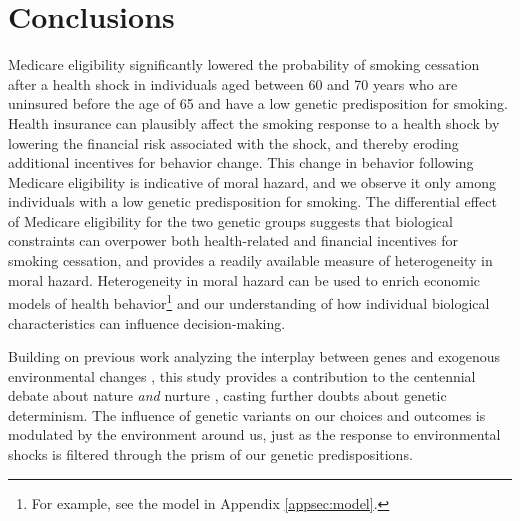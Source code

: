 \documentclass[11pt]{article}
\begin{document}
\section{Conclusions}\label{sec:conclusion}

Medicare eligibility significantly lowered the probability of smoking cessation after a health shock in individuals aged between 60 and 70 years who are uninsured before the age of 65 and have a low genetic predisposition for smoking.
Health insurance can plausibly affect the smoking response to a health shock by lowering the financial risk associated with the shock, and thereby eroding additional incentives for behavior change.
This change in behavior following Medicare eligibility is indicative of moral hazard, and we observe it only among individuals with a low genetic predisposition for smoking.
The differential effect of Medicare eligibility for the two genetic groups suggests that biological constraints can overpower both health-related and financial incentives for smoking cessation, and provides a readily available measure of heterogeneity in moral hazard.
Heterogeneity in moral hazard can be used to enrich economic models of health behavior\footnote{For example, see the model in Appendix \ref{appsec:model}.} and our understanding of how individual biological characteristics can influence decision-making.

Building on previous work analyzing the interplay between genes and exogenous environmental changes \citep{Fletcher2012,Schmitz2017,Barcellos2018}, this study provides a contribution to the centennial debate about nature \textit{and} nurture \citep{Mulcaster1582,Galton1874,Haldane1946,Lundborg2010,Kong2018}, casting further doubts about genetic determinism.
The influence of genetic variants on our choices and outcomes is modulated by the environment around us, just as the response to environmental shocks is filtered through the prism of our genetic predispositions.
\end{document}

